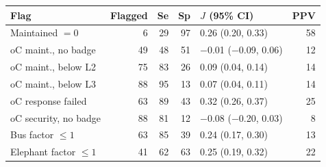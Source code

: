 \begin{tabular}{lrrrlr}
\toprule
Flag & Flagged & Se & Sp & $J$ (95\% CI) & PPV \\
\midrule
Maintained $=0$ & 6 & 29 & 97 & 0.26 (0.20, 0.33) & 58 \\
oC maint., no badge & 49 & 48 & 51 & $-$0.01 ($-$0.09, 0.06) & 12 \\
oC maint., below L2 & 75 & 83 & 26 & 0.09 (0.04, 0.14) & 14 \\
oC maint., below L3 & 88 & 95 & 13 & 0.07 (0.04, 0.11) & 14 \\
oC response failed & 63 & 89 & 43 & 0.32 (0.26, 0.37) & 25 \\
oC security, no badge & 88 & 81 & 12 & $-$0.08 ($-$0.20, 0.03) & 8 \\
Bus factor $\leq 1$ & 63 & 85 & 39 & 0.24 (0.17, 0.30) & 13 \\
Elephant factor $\leq 1$ & 41 & 62 & 63 & 0.25 (0.19, 0.32) & 22 \\
\bottomrule
\end{tabular}
